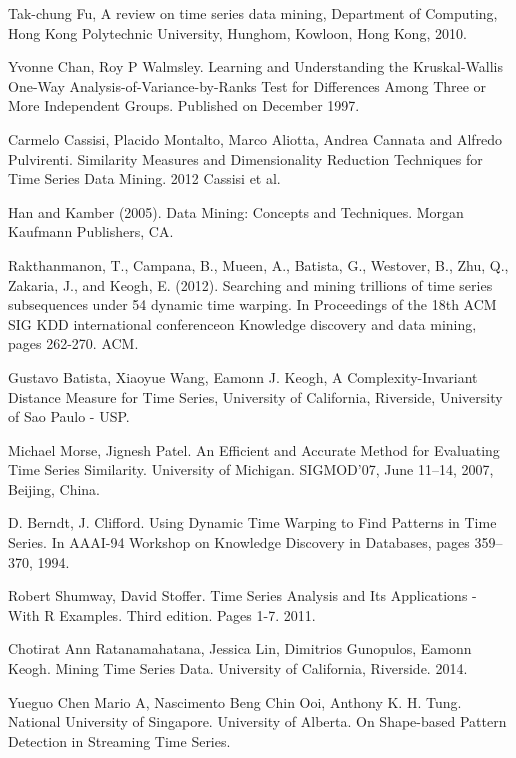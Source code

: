\begin{thebibliography}{9}
Tak-chung Fu, A review on time series data mining, Department of Computing, Hong Kong Polytechnic University, Hunghom, Kowloon, Hong Kong, 2010.

Yvonne Chan, Roy P Walmsley. Learning and Understanding the Kruskal-Wallis One-Way Analysis-of-Variance-by-Ranks Test for Differences Among Three or More Independent Groups. Published on December 1997.

Carmelo Cassisi, Placido Montalto, Marco Aliotta, Andrea Cannata and Alfredo Pulvirenti. Similarity Measures
and Dimensionality Reduction Techniques for Time Series Data Mining. 2012 Cassisi et al.

Han and Kamber (2005). Data Mining: Concepts and Techniques. Morgan Kaufmann
Publishers, CA.

Rakthanmanon, T., Campana, B., Mueen, A., Batista, G., Westover, B., Zhu, Q., Zakaria, J., and Keogh, E. (2012). Searching and mining trillions of time series subsequences under 54 dynamic time warping. In Proceedings of the 18th ACM SIG KDD international conferenceon Knowledge discovery and data mining, pages 262-270. ACM.

Gustavo Batista, Xiaoyue Wang, Eamonn J. Keogh, A Complexity-Invariant Distance Measure for Time Series, University of California, Riverside, University of Sao Paulo - USP.

Michael Morse, Jignesh Patel. An Efficient and Accurate Method for Evaluating Time Series Similarity. University of Michigan. SIGMOD’07, June 11–14, 2007, Beijing, China.

D. Berndt, J. Clifford. Using Dynamic Time Warping to Find Patterns in Time Series. In AAAI-94 Workshop on Knowledge Discovery in Databases, pages 359–370, 1994.

Robert Shumway, David Stoffer. Time Series Analysis and Its Applications - With R Examples. Third edition. Pages 1-7. 2011.

Chotirat Ann Ratanamahatana, Jessica Lin, Dimitrios Gunopulos, Eamonn Keogh. Mining Time Series Data. University of California, Riverside. 2014.

Yueguo Chen Mario A, Nascimento Beng Chin Ooi, Anthony K. H. Tung. National University of Singapore. University of Alberta. On Shape-based Pattern Detection in Streaming Time Series.


\end{thebibliography}

